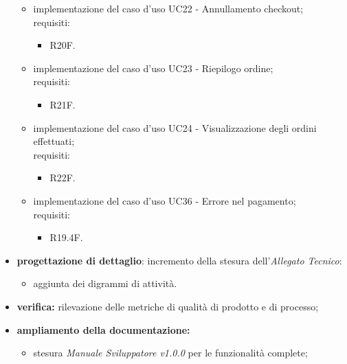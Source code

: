\begin{itemize}
\begin{itemize}
\begin{itemize}
                    \end{itemize}
              \item implementazione del caso d'uso UC22 -  Annullamento checkout;\\
                    requisiti:
                    \begin{itemize}
                        \item R20F.
                    \end{itemize}
              \item implementazione del caso d'uso UC23 -  Riepilogo ordine;\\
                    requisiti:
                    \begin{itemize}
                        \item R21F.
                    \end{itemize}
              \item implementazione del caso d'uso UC24 - Visualizzazione degli ordini effettuati;\\
                    requisiti:
                    \begin{itemize}
                        \item R22F.
                    \end{itemize}
              \item implementazione del caso d'uso UC36 -  Errore nel pagamento;\\
                    requisiti:
                    \begin{itemize}
                        \item R19.4F.
                    \end{itemize}
          \end{itemize}
    \item \textbf{progettazione di dettaglio}: incremento della stesura dell'\textit{Allegato Tecnico}:
          \begin{itemize}
              \item aggiunta dei digrammi di attività.
          \end{itemize}
    \item \textbf{verifica:} rilevazione delle metriche di qualità di prodotto e di processo;
    \item \textbf{ampliamento della documentazione:}
          \begin{itemize}
              \item stesura \textit{Manuale Sviluppatore v1.0.0} per le funzionalità complete;

\end{itemize}
\end{itemize}
